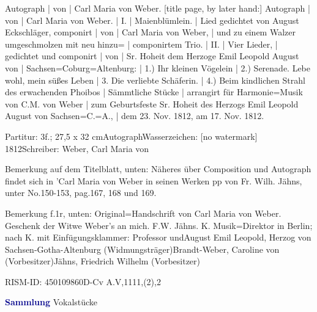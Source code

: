 \documentclass[a4paper, twocolumn, 11pt]{book}
\begin{document}
\par \begin{itshape} Autograph | von | Carl Maria von Weber. [title page, by later hand:] Autograph | von | Carl Maria von Weber. | I. | Maienblümlein. | Lied gedichtet von August Eckschläger, componirt | von | Carl Maria von Weber, | und zu einem Walzer umgeschmolzen mit neu hinzu= | componirtem Trio. | II. | Vier Lieder, | gedichtet und componirt | von | Sr. Hoheit dem Herzoge Emil Leopold August von | Sachsen=Coburg=Altenburg: | 1.) {\textquotedbl}Ihr kleinen Vögelein{\textquotedbl} | 2.) Serenade. {\textquotedbl}Lebe wohl, mein süßes Leben{\textquotedbl} | 3. Die verliebte Schäferin. | 4.) {\textquotedbl}Beim kindlichen Strahl des erwachenden Phoibos{\textquotedbl} | Sämmtliche Stücke | arrangirt für Harmonie=Musik von C.M. von Weber | zum Geburtsfeste Sr. Hoheit des Herzogs Emil Leopold August von Sachsen=C.=A., | dem 23. Nov. 1812, am 17. Nov. 1812.\end{itshape} 
\par \textcolor{darkblue}{}  Partitur: 3f.; 27,5 x 32 cm\newline Autograph\newline Wasserzeichen: [no watermark]  1812\newline Schreiber: Weber, Carl Maria von
\par Bemerkung auf dem Titelblatt, unten: Näheres über Composition und Autograph findet sich in {\textquotedbl}'Carl Maria von Weber in seinen Werken pp{\textquotedbl} von Fr. Wilh. Jähns, unter No.150-153, pag.167, 168 und 169.
\par Bemerkung f.1r, unten: {\textquotedbl}Original=Handschrift von Carl Maria von Weber. Geschenk der Witwe Weber's an mich. F.W. Jähns. K. Musik=Direktor in Berlin{\textquotedbl}; nach {\textquotedbl}K.{\textquotedbl} mit Einfügungsklammer: {\textquotedbl}Professor und{\textquotedbl}\newline August Emil Leopold, Herzog von Sachsen-Gotha-Altenburg  (Widmungsträger)\newline Brandt-Weber, Caroline von  (Vorbesitzer)\newline Jähns, Friedrich Wilhelm  (Vorbesitzer)
\par RISM-ID: 450109860\newline D-Cv  A.V,1111,(2),2
\par \vspace{16pt} \textcolor{darkblue}{\textbf{Sammlung}}\hfillplus{[81]} Vokalstücke
\end{document}

